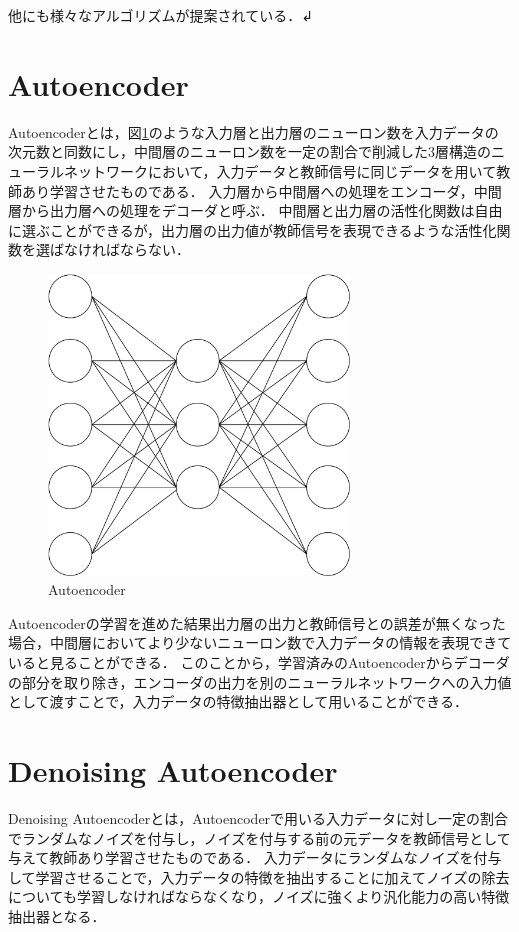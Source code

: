 他にも様々なアルゴリズムが提案されている．↲

\section{Autoencoder}
Autoencoderとは，図\ref{autoencoder}のような入力層と出力層のニューロン数を入力データの次元数と同数にし，中間層のニューロン数を一定の割合で削減した3層構造のニューラルネットワークにおいて，入力データと教師信号に同じデータを用いて教師あり学習させたものである．
入力層から中間層への処理をエンコーダ，中間層から出力層への処理をデコーダと呼ぶ．
中間層と出力層の活性化関数は自由に選ぶことができるが，出力層の出力値が教師信号を表現できるような活性化関数を選ばなければならない．

\begin{figure}[hbtp]
  \centering
  \includegraphics[bb=0 0 507 506, width=8cm]{Figures/autoencoder.pdf}
  \caption{Autoencoder}
  \label{autoencoder}
\end{figure}

Autoencoderの学習を進めた結果出力層の出力と教師信号との誤差が無くなった場合，中間層においてより少ないニューロン数で入力データの情報を表現できていると見ることができる．
このことから，学習済みのAutoencoderからデコーダの部分を取り除き，エンコーダの出力を別のニューラルネットワークへの入力値として渡すことで，入力データの特徴抽出器として用いることができる．

\section{Denoising Autoencoder}
Denoising Autoencoderとは，Autoencoderで用いる入力データに対し一定の割合でランダムなノイズを付与し，ノイズを付与する前の元データを教師信号として与えて教師あり学習させたものである．
入力データにランダムなノイズを付与して学習させることで，入力データの特徴を抽出することに加えてノイズの除去についても学習しなければならなくなり，ノイズに強くより汎化能力の高い特徴抽出器となる．

